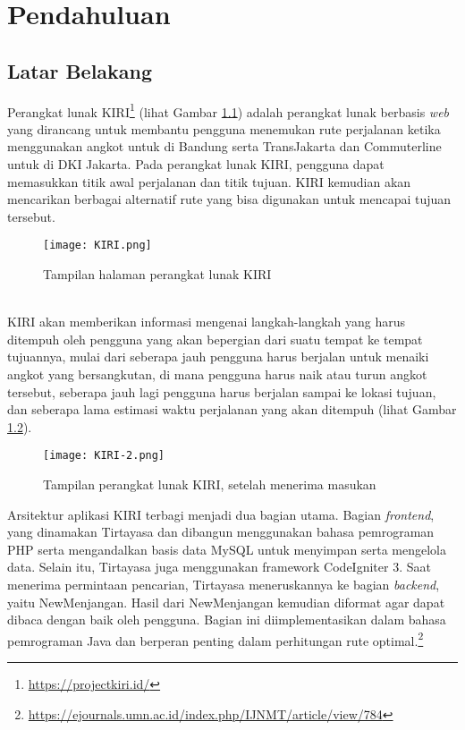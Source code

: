 \chapter{Pendahuluan}
\label{chap:intro}
   
\section{Latar Belakang}
\label{sec:label}
Perangkat lunak KIRI\footnote{\url{https://projectkiri.id/}} (lihat Gambar \ref{fig:kiri}) adalah perangkat lunak berbasis \textit{web} yang dirancang untuk membantu pengguna menemukan rute perjalanan ketika menggunakan angkot untuk di Bandung serta TransJakarta dan Commuterline untuk di DKI Jakarta. Pada perangkat lunak KIRI, pengguna dapat memasukkan titik awal perjalanan dan titik tujuan. KIRI kemudian akan mencarikan berbagai alternatif rute yang bisa digunakan untuk mencapai tujuan tersebut.
\begin{figure}[h] 
	\centering  
	\texttt{[image: KIRI.png]}  
	\caption{Tampilan halaman perangkat lunak KIRI}
	\label{fig:kiri} 
\end{figure}
\\
KIRI akan memberikan informasi mengenai langkah-langkah yang harus ditempuh oleh pengguna yang akan bepergian dari suatu tempat ke tempat tujuannya, mulai dari seberapa jauh pengguna harus berjalan untuk menaiki angkot yang bersangkutan, di mana pengguna harus naik atau turun angkot tersebut, seberapa jauh lagi pengguna harus berjalan sampai ke lokasi tujuan, dan seberapa lama estimasi waktu perjalanan yang akan ditempuh (lihat Gambar \ref{fig:kiri2}).
\begin{figure}[H] 
	\centering  
	\texttt{[image: KIRI-2.png]}  
	\caption{Tampilan perangkat lunak KIRI, setelah menerima masukan}
	\label{fig:kiri2} 
\end{figure}
\noindent
Arsitektur aplikasi KIRI terbagi menjadi dua bagian utama. Bagian \textit{frontend}, yang dinamakan Tirtayasa dan dibangun menggunakan bahasa pemrograman PHP serta mengandalkan basis data MySQL untuk menyimpan serta mengelola data. Selain itu, Tirtayasa juga menggunakan framework CodeIgniter 3. Saat menerima permintaan pencarian, Tirtayasa meneruskannya ke bagian \textit{backend}, yaitu NewMenjangan. Hasil dari NewMenjangan kemudian diformat agar dapat dibaca dengan baik oleh pengguna. Bagian ini diimplementasikan dalam bahasa pemrograman Java dan berperan penting dalam perhitungan rute optimal.\footnote{\url{https://ejournals.umn.ac.id/index.php/IJNMT/article/view/784}}
